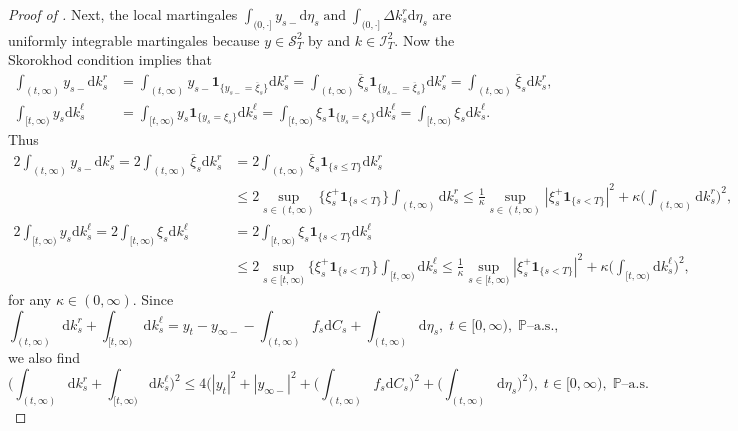 \documentclass[10pt]{article} %
\newcommand\cI{\mathcal I}
\newcommand\cS{\mathcal S}
\def \P{\mathbb{P}}
\def\d{\mathrm{d}}
\begin{document}
\begin{proof}[Proof of ]
Next, the local martingales $\int_{(0,\cdot]} y_{s-} \d \eta_s \; \text{and} \; \int_{(0,\cdot]} \Delta k^r_s \d \eta_s$ are uniformly integrable martingales because $y \in \cS^2_T$ by  and $k \in \cI^2_T$. Now the Skorokhod condition implies that
\begin{align*}
	\int_{(t,\infty)} y_{s-} \d  k^r_s &= \int_{(t,\infty)} y_{s-} \mathbf{1}_{\{y_{s-} = \overline\xi_s\}} \d  k^r_s = \int_{(t,\infty)} \overline\xi_s \mathbf{1}_{\{y_{s-} = \overline\xi_s\}} \d  k^r_s = \int_{(t,\infty)} \overline\xi_s \d k^r_s,\\
	\int_{[t,\infty)} y_s \d k^\ell_s &= \int_{[t,\infty)} y_s \mathbf{1}_{\{y_s = \xi_s\}}\d k^\ell_s = \int_{[t,\infty)} \xi_s \mathbf{1}_{\{y_s = \xi_s\}} \d k^\ell_s = \int_{[t,\infty)} \xi_s \d k^\ell_s.
\end{align*}
Thus
\begin{align}\label{eq::cond_kr}
	2\int_{(t,\infty)} y_{s-} \d  k^r_s = 2\int_{(t,\infty)} \overline\xi_s \d  k^r_s &= 2\int_{(t,\infty)} \overline{\xi}_s \mathbf{1}_{\{s \leq T\}} \d k^r_s \nonumber\\
	& \leq 2 \sup_{s \in (t,\infty)} \big\{\xi^+_s \mathbf{1}_{\{s < T\}}\big\} \int_{(t,\infty)} \d k^r_s \leq \frac{1}{\kappa} \sup_{s \in (t,\infty)} |\xi^+_s\mathbf{1}_{\{s < T\}}|^2  + \kappa \bigg(\int_{(t,\infty)} \d k^r_s \bigg)^2,\\
	2\int_{[t,\infty)} y_s\d k^\ell_s = 2\int_{[t,\infty)} \xi_s \d k^\ell_s &= 2\int_{[t,\infty)} \xi_s \mathbf{1}_{\{s < T\}} \d k^\ell_s \nonumber\\
	&\leq 2 \sup_{s \in [t,\infty)} \big\{\xi^+_s \mathbf{1}_{\{s < T\}} \big\}\int_{[t,\infty)} \d k^\ell_s 
	\leq \frac{1}{\kappa} \sup_{s \in [t,\infty)} |\xi^+_s \mathbf{1}_{\{s < T\}}|^2  + \kappa \bigg(\int_{[t,\infty)} \d k^\ell_s \bigg)^2, \label{eq::cond_kell}
\end{align}
for any $\kappa \in (0,\infty)$. Since
\begin{equation*}
	\int_{(t,\infty)} \d k^r_s + \int_{[t,\infty)} \d k^\ell_s = y_t - y_{\infty-} - \int_{(t,\infty)} f_s \d C_s + \int_{(t,\infty)} \d \eta_s, \; t \in [0,\infty), \; \text{$\P$--a.s.},
\end{equation*}
we also find
\begin{equation}\label{eq::cond_k1}
	\bigg(\int_{(t,\infty)} \d k^r_s + \int_{[t,\infty)} \d k^\ell_s \bigg)^2 \leq 4 \bigg( |y_t|^2 + |y_{\infty-}|^2 + \bigg(\int_{(t,\infty)} f_s \d C_s\bigg)^2 + \bigg(\int_{(t,\infty)} \d \eta_s\bigg)^2 \bigg), \; t \in [0,\infty), \; \text{$\P$--a.s.}
\end{equation}


\end{proof}
\end{document}
